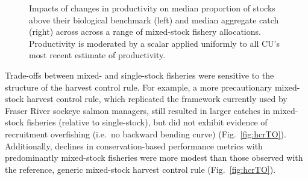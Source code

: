 \documentclass[11pt]{book}
\begin{document}
\begin{figure}[htb]

{\centering {} 

}

\caption{Impacts of changes in productivity on median proportion of stocks above their biological benchmark (left) and median aggregate catch (right) across across a range of mixed-stock fishery allocations. Productivity is moderated by a scalar applied uniformly to all CU's most recent estimate of productivity.}\label{fig:prodTO}
\end{figure}
Trade-offs between mixed- and single-stock fisheries were sensitive to the structure of the harvest control rule. For example, a more precautionary mixed-stock harvest control rule, which replicated the framework currently used by Fraser River sockeye salmon managers, still resulted in larger catches in mixed-stock fisheries (relative to single-stock), but did not exhibit evidence of recruitment overfishing (i.e.~no backward bending curve) (Fig.~\ref{fig:hcrTO}). Additionally, declines in conservation-based performance metrics with predominantly mixed-stock fisheries were more modest than those observed with the reference, generic mixed-stock harvest control rule (Fig.~\ref{fig:hcrTO}).
\end{document}

